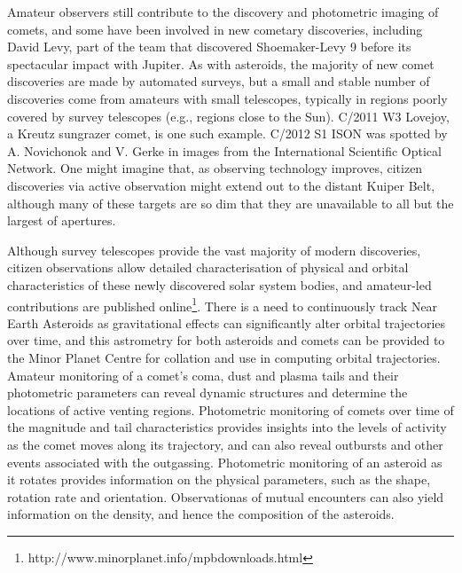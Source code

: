 \documentclass{ar2e}
\begin{document}
Amateur observers still contribute to the discovery and photometric imaging of
comets, and some have been involved in new cometary
discoveries, including David Levy, part of the team that discovered
Shoemaker-Levy 9 before its spectacular impact with Jupiter. 
As with asteroids,
the majority of new comet discoveries are made by automated surveys, but a small
and stable number of discoveries come from amateurs with small telescopes,
typically in regions poorly covered by survey telescopes (e.g., regions close to
the Sun).  C/2011 W3 Lovejoy, a Kreutz sungrazer comet, is one such example. 
C/2012 S1 ISON was spotted by A. Novichonok and V. Gerke in images from the
International Scientific Optical Network.
One might imagine that, as observing technology improves, citizen discoveries
via active observation might extend out to the distant Kuiper Belt, although
many of these targets are so dim that they are unavailable to all but the
largest of apertures.

Although survey telescopes provide the vast majority of modern discoveries,
citizen observations allow detailed characterisation of physical and orbital
characteristics of these newly discovered solar system bodies, and amateur-led
contributions are published
online\footnote{http://www.minorplanet.info/mpbdownloads.html}.  There is a
need to continuously track Near Earth Asteroids as gravitational effects can
significantly alter orbital trajectories over time, and this astrometry for
both asteroids and comets can be provided to the Minor Planet Centre for
collation and use in computing orbital trajectories.  Amateur monitoring of a
comet's coma, dust and plasma tails and their photometric parameters can
reveal dynamic structures and determine the locations of active venting
regions.  Photometric monitoring of comets over time of the magnitude and tail
characteristics provides insights into the levels of activity as the comet
moves along its trajectory, and can also reveal outbursts and other events
associated with the outgassing.  Photometric monitoring of an asteroid as it
rotates provides information on the physical parameters, such as the shape,
rotation rate and orientation.  Observationas of mutual encounters can also
yield information on the density, and hence the composition of the asteroids.
\end{document}

